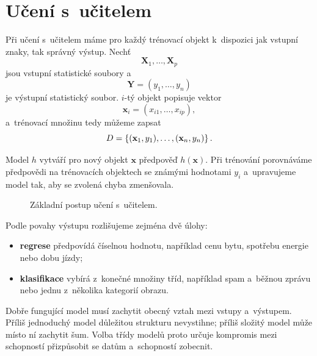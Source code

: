 \section{Učení s~učitelem}\label{sec:ai-supervised}

Při učení s~učitelem máme pro každý trénovací objekt k~dispozici jak vstupní znaky, tak správný výstup. Nechť
\[
    \mathbf{X}_1,\ldots,\mathbf{X}_p
\]
jsou vstupní statistické soubory a
\[
    \mathbf{Y}=(y_1,\ldots,y_n)
\]
je výstupní statistický soubor. \(i\)-tý objekt popisuje vektor
\[
    \mathbf{x}_i=(x_{i1},\ldots,x_{ip}),
\]
a~trénovací množinu tedy můžeme zapsat
\[
    D=
    \left\{
        (\mathbf{x}_1,y_1),\ldots,
        (\mathbf{x}_n,y_n)
    \right\}.
\]

Model \(h\) vytváří pro nový objekt \(\mathbf{x}\) předpověď \(h(\mathbf{x})\). Při trénování porovnáváme předpovědi na trénovacích objektech se známými hodnotami \(y_i\) a~upravujeme model tak, aby se zvolená chyba zmenšovala.

\begin{figure}[ht]
    \centering
    
    \caption{Základní postup učení s~učitelem.}
    \label{fig:ai-supervised}
\end{figure}

Podle povahy výstupu rozlišujeme zejména dvě úlohy:
\begin{itemize}
    \item \textbf{regrese} předpovídá číselnou hodnotu, například cenu bytu, spotřebu energie nebo dobu jízdy;
    \item \textbf{klasifikace} vybírá z~konečné množiny tříd, například spam a~běžnou zprávu nebo jednu z~několika kategorií obrazu.
\end{itemize}

Dobře fungující model musí zachytit obecný vztah mezi vstupy a~výstupem. Příliš jednoduchý model důležitou strukturu nevystihne; příliš složitý model může místo ní zachytit šum. Volba třídy modelů proto určuje kompromis mezi schopností přizpůsobit se datům a~schopností zobecnit.

